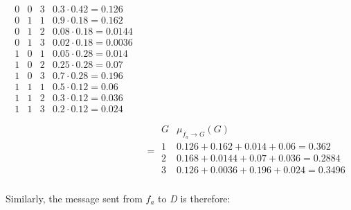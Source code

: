 \documentclass[a4paper, 12pt]{article}
\begin{document}
\begin{align}
\begin{array}{ccc|c}
		0 & 0 & 3 & 0.3 \cdot 0.42 = 0.126\\
		0 & 1 & 1 & 0.9 \cdot 0.18 = 0.162\\
		0 & 1 & 2 & 0.08 \cdot 0.18 = 0.0144\\
		0 & 1 & 3 & 0.02 \cdot 0.18 = 0.0036\\
		1 & 0 & 1 & 0.05 \cdot 0.28 = 0.014\\
		1 & 0 & 2 & 0.25 \cdot 0.28 = 0.07\\
		1 & 0 & 3 & 0.7 \cdot 0.28 = 0.196\\
		1 & 1 & 1 & 0.5 \cdot 0.12 = 0.06\\
		1 & 1 & 2 & 0.3 \cdot 0.12 = 0.036\\
		1 & 1 & 3 & 0.2 \cdot 0.12 = 0.024\\
	\end{array}\\
	&= \begin{array}{c|c}
		G & \mu_{f_a \to G}(G)\\
		\hline
		1 & 0.126 + 0.162 + 0.014 + 0.06 = 0.362\\
		2 & 0.168 + 0.0144 + 0.07 + 0.036 = 0.2884\\
		3 & 0.126 + 0.0036 + 0.196 + 0.024 = 0.3496\\
	\end{array}
\end{align}

Similarly, the message sent from $f_a$ to \textit{D} is therefore:
\end{document}
